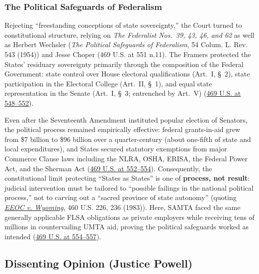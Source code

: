 \documentclass[12pt]{article}
\begin{document}
\subsubsection{The Political Safeguards of Federalism}

Rejecting ``freestanding conceptions of state sovereignty,'' the Court turned to constitutional structure, relying on \textit{The Federalist Nos.~39, 43, 46, and 62} as well as Herbert Wechsler (\textit{The Political Safeguards of Federalism}, 54 Colum. L. Rev. 543 (1954)) and Jesse Choper (469 U.S. at 551 n.11). The Framers protected the States' residuary sovereignty primarily through the composition of the Federal Government: state control over House electoral qualifications (Art.~I, \S~2), state participation in the Electoral College (Art.~II, \S~1), and equal state representation in the Senate (Art.~I, \S~3; entrenched by Art.~V) (\href{https://supreme.justia.com/cases/federal/us/469/528/}{469 U.S. at 548--552}).

Even after the Seventeenth Amendment instituted popular election of Senators, the political process remained empirically effective: federal grants-in-aid grew from \$7 billion to \$96 billion over a quarter-century (about one-fifth of state and local expenditures), and States secured statutory exemptions from major Commerce Clause laws including the NLRA, OSHA, ERISA, the Federal Power Act, and the Sherman Act (\href{https://supreme.justia.com/cases/federal/us/469/528/}{469 U.S. at 552--554}). Consequently, the constitutional limit protecting ``States as States'' is one of \textbf{process, not result}: judicial intervention must be tailored to ``possible failings in the national political process,'' not to carving out a ``sacred province of state autonomy'' (quoting \href{https://supreme.justia.com/cases/federal/us/460/226/}{\textit{EEOC v. Wyoming}}, 460 U.S. 226, 236 (1983)). Here, SAMTA faced the same generally applicable FLSA obligations as private employers while receiving tens of millions in countervailing UMTA aid, proving the political safeguards worked as intended (\href{https://supreme.justia.com/cases/federal/us/469/528/}{469 U.S. at 554--557}).

\subsection{Dissenting Opinion (Justice Powell)}
\end{document}
